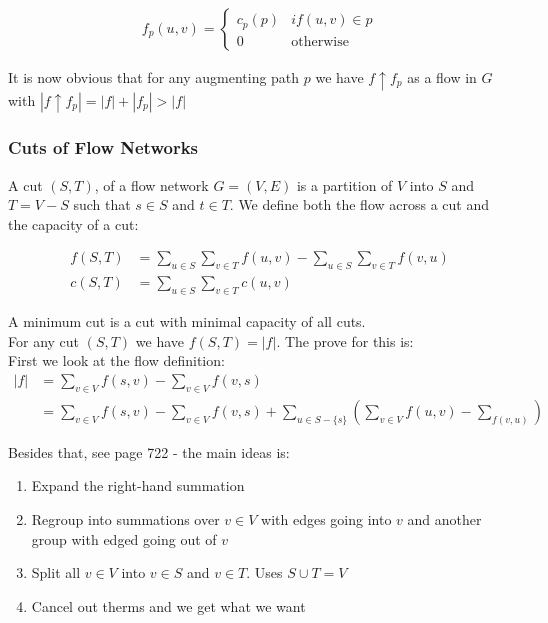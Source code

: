 \documentclass[12pt]{article}
\begin{document}
\begin{align}
 f_p(u, v) =
  \begin{cases}
  	c_p(p) & if (u, v) \in p \\
  	0 & \text{otherwise}
  \end{cases}
\end{align}

It is now obvious that for any augmenting path $p$ we have $f \uparrow f_p$ as a flow in $G$ with $|f \uparrow f_p| = |f| + |f_p| > |f|$
%
\subsubsection{Cuts of Flow Networks}
A cut $(S, T)$, of a flow network $G = (V, E)$ is a partition of $V$ into $S$ and $T = V - S$ such that $s \in S$ and $t \in T$. We define both the flow across a cut and the capacity of a cut:

\begin{align}
f(S, T) &= \sum_{u \in S} \sum_{v \in T} f(u, v) - \sum_{u \in S} \sum_{v \in T} f(v, u)\\
c(S, T) &= \sum_{u \in S} \sum_{v \in T} c(u, v)
\end{align}

A minimum cut is a cut with minimal capacity of all cuts. \\
For any cut $(S, T)$ we have $f(S, T) = |f|$. The prove for this is:\\

First we look at the flow definition:
\begin{align*}
|f| &= \sum_{v \in V} f(s, v) - \sum_{v \in V} f(v, s)\\
&= \sum_{v \in V} f(s, v) - \sum_{v \in V} f(v, s) + \sum_{u \in S - \{s\}} \left ( \sum_{v \in V} f(u, v) - \sum_{f(v, u)}\right)
\end{align*}

Besides that, see page 722 - the main ideas is: 

\begin{enumerate}
	\item Expand the right-hand summation 
	\item Regroup into summations over $v \in V$ with edges going into $v$ and another group with edged going out of $v$
	\item Split all $v \in V$ into $v \in S$ and $v \in T$. Uses $S \cup T = V$
	\item Cancel out therms and we get what we want
\end{enumerate}
\end{document}
